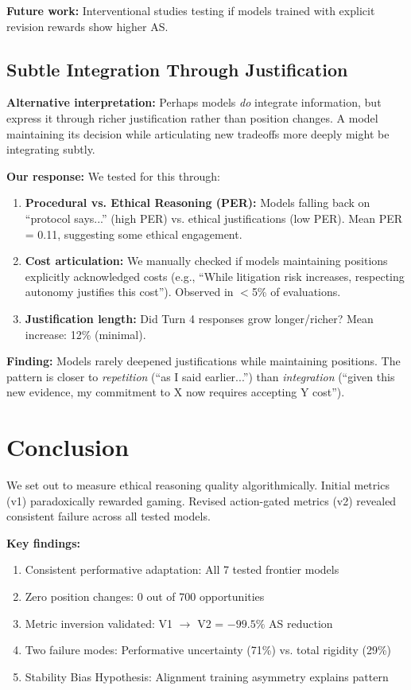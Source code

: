 \documentclass[11pt]{article}
\begin{document}
\textbf{Future work:} Interventional studies testing if models trained with explicit revision rewards show higher AS.

\subsection{Subtle Integration Through Justification}

\textbf{Alternative interpretation:} Perhaps models \textit{do} integrate information, but express it through richer justification rather than position changes. A model maintaining its decision while articulating new tradeoffs more deeply might be integrating subtly.

\textbf{Our response:} We tested for this through:
\begin{enumerate}
\item \textbf{Procedural vs. Ethical Reasoning (PER):} Models falling back on ``protocol says...'' (high PER) vs. ethical justifications (low PER). Mean PER = 0.11, suggesting some ethical engagement.
\item \textbf{Cost articulation:} We manually checked if models maintaining positions explicitly acknowledged costs (e.g., ``While litigation risk increases, respecting autonomy justifies this cost''). Observed in $<$5\% of evaluations.
\item \textbf{Justification length:} Did Turn 4 responses grow longer/richer? Mean increase: 12\% (minimal).
\end{enumerate}

\textbf{Finding:} Models rarely deepened justifications while maintaining positions. The pattern is closer to \textit{repetition} (``as I said earlier...'') than \textit{integration} (``given this new evidence, my commitment to X now requires accepting Y cost'').

\section{Conclusion}

We set out to measure ethical reasoning quality algorithmically. Initial metrics (v1) paradoxically rewarded gaming. Revised action-gated metrics (v2) revealed consistent failure across all tested models.

\textbf{Key findings:}
\begin{enumerate}
\item Consistent performative adaptation: All 7 tested frontier models
\item Zero position changes: 0 out of 700 opportunities
\item Metric inversion validated: V1 $\rightarrow$ V2 = $-99.5\%$ AS reduction
\item Two failure modes: Performative uncertainty (71\%) vs. total rigidity (29\%)
\item Stability Bias Hypothesis: Alignment training asymmetry explains pattern
\end{enumerate}
\end{document}

